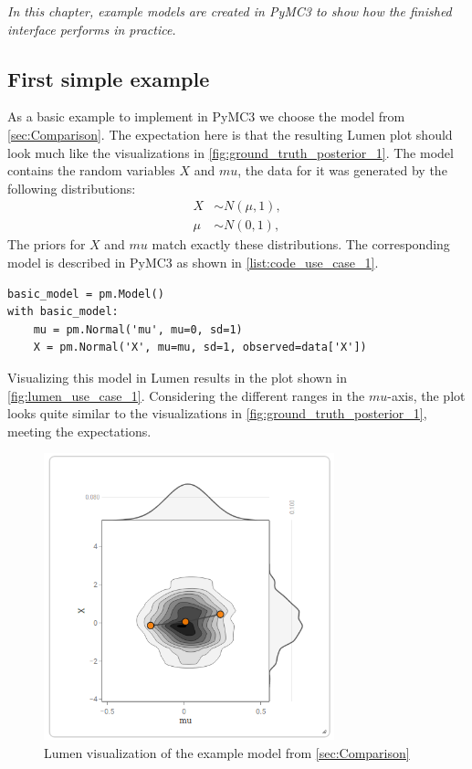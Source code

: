 \documentclass{article}
\begin{document}
\textit{In this chapter, example models are created in PyMC3 to show how the finished interface performs in practice.}

\subsection{First simple example}
As a basic example to implement in PyMC3 we choose the model from \autoref{sec:Comparison}. The expectation here is that the resulting Lumen plot should look much like the visualizations in \autoref{fig:ground_truth_posterior_1}. The model contains the random variables $X$ and $mu$, the data for it was generated by the following  distributions:
\begin{equation}
\begin{split}
X &\sim N(\mu,1), \\
\mu &\sim N(0,1),
\end{split}
\end{equation}
The priors for $X$ and $mu$ match exactly these distributions. The corresponding model is described in PyMC3 as shown in \autoref{list:code_use_case_1}.
\begin{lstlisting}[caption={PyMC3 model of use case 1}, label={list:code_use_case_1},captionpos=b]
basic_model = pm.Model()
with basic_model:
    mu = pm.Normal('mu', mu=0, sd=1)
    X = pm.Normal('X', mu=mu, sd=1, observed=data['X'])
\end{lstlisting}
Visualizing this model in Lumen results in the plot shown in \autoref{fig:lumen_use_case_1}. Considering the different ranges in the $mu$-axis, the plot looks quite similar to the visualizations in \autoref{fig:ground_truth_posterior_1}, meeting the expectations.
\begin{figure}
	\centering
	\includegraphics[width=0.75\textwidth]{images/lumen_use_case_1_2.png}
	\caption{Lumen visualization of the example model from \autoref{sec:Comparison}}
	\label{fig:lumen_use_case_1}
\end{figure}
\FloatBarrier
\end{document}
